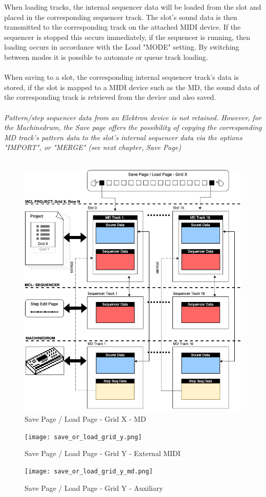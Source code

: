 When loading tracks, the internal sequencer data will be loaded from the slot and placed in the corresponding sequencer track. The slot's sound data is then transmitted to the corresponding track on the attached MIDI device. If the sequencer is stopped this occurs immediately, if the sequencer is running, then loading occurs in accordance with the Load "MODE" setting. By switching between modes it is possible to automate or queue track loading.
\\\\
When saving to a slot, the corresponding internal sequencer track's data is stored, if the slot is mapped to a MIDI device such as the MD, the sound data of the corresponding track is retrieved from the device and also saved.\\
\\
\textit{Pattern/step sequencer data from an Elektron device is not retained. However, for the Machinedrum, the Save page offers the possibility of copying the corresponding MD track's pattern data to the slot's internal sequencer data via the options "IMPORT", or "MERGE" (see next chapter, Save Page)}
\\\\

\begin{figure}
    \centering
    \includegraphics[scale=0.7]{save_or_load_grid_x.png}
    \caption{Save Page / Load Page - Grid X - MD }
    \label{fig:my_label}
\end{figure}
\begin{figure}
    \centering
    \texttt{[image: save\_or\_load\_grid\_y.png]}
    \caption{Save Page / Load Page - Grid Y - External MIDI}
    \label{fig:my_label}
\end{figure}
\begin{figure}
    \centering
    \texttt{[image: save\_or\_load\_grid\_y\_md.png]}
    \caption{Save Page / Load Page - Grid Y - Auxiliary}
    \label{fig:my_label}
\end{figure}
